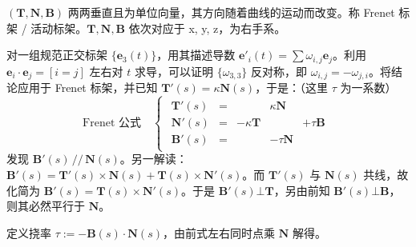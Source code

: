 \documentclass[12pt, a4paper, UTF8, openany]{ctexbook}
\newcommand{\mat}[1]{\mathbf{#1}}
\begin{document}

        $(\mat{T}, \mat{N}, \mat{B})$ 两两垂直且为单位向量，其方向随着曲线的运动而改变。称 Frenet 标架 / 活动标架。$\mat{T}, \mat{N}, \mat{B}$ 依次对应于 x, y, z，为右手系。

        对一组规范正交标架 $\{\mat{e}_3(t)\}$，用其描述导数 $\mat{e}'_i(t) = \sum \omega_{i, j} \mat{e}_j$。利用 $\mat{e}_i \cdot \mat{e}_j = [i = j]$ 左右对 $t$ 求导，可以证明 $\{\omega_{3, 3}\}$ 反对称，即 $\omega_{i, j} = -\omega_{j, i}$。将结论应用于 Frenet 标架，并已知 $\mat{T}'(s) = \kappa\mat{N}(s)$，于是：（这里 $\tau$ 为一系数）
        $$\text{Frenet 公式} \quad \begin{cases}
            \begin{matrix}
                \mat{T}'(s) & = &                    & \kappa \mat{N} & \\
                \mat{N}'(s) & = & -\kappa \mat{T} &                   & +\tau \mat{B} \\
                \mat{B}'(s) & = &                    & -\tau \mat{N}  &
            \end{matrix}
        \end{cases}$$
        发现 $\mat{B}'(s) \,//\, \mat{N}(s)$。另一解读：$\mat{B}'(s) = \mat{T}'(s) \times \mat{N}(s) + \mat{T}(s) \times \mat{N}'(s)$。而 $\mat{T}'(s)$ 与 $\mat{N}(s)$ 共线，故化简为 $\mat{B}'(s) = \mat{T}(s) \times \mat{N}'(s)$。于是 $\mat{B}'(s) \bot \mat{T}$，另由前知 $\mat{B}'(s) \bot \mat{B}$，则其必然平行于 $\mat{N}$。

        定义挠率 $\tau := -\mat{B}(s) \cdot \mat{N}(s)$，由前式左右同时点乘 $\mat{N}$ 解得。
\end{document}
